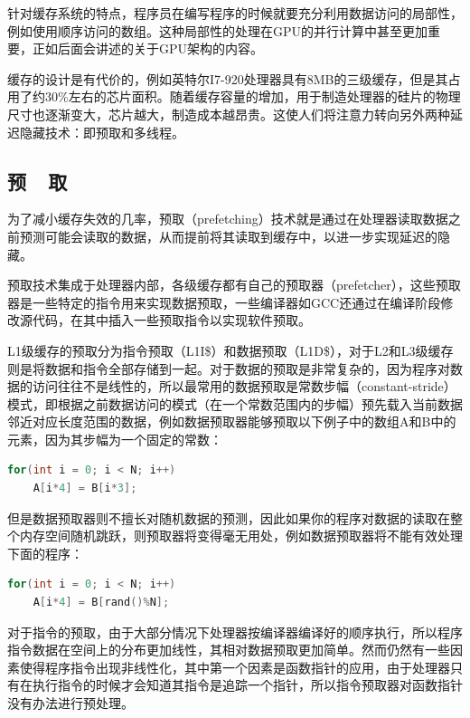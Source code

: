 针对缓存系统的特点，程序员在编写程序的时候就要充分利用数据访问的局部性，例如使用顺序访问的数组。这种局部性的处理在GPU的并行计算中甚至更加重要，正如后面会讲述的关于GPU架构的内容。

缓存的设计是有代价的，例如英特尔I7-920处理器具有8MB的三级缓存，但是其占用了约$30\%$左右的芯片面积。随着缓存容量的增加，用于制造处理器的硅片的物理尺寸也逐渐变大，芯片越大，制造成本越昂贵。这使人们将注意力转向另外两种延迟隐藏技术：即预取和多线程。




\subsection{预~~取}
为了减小缓存失效的几率，预取（prefetching）技术就是通过在处理器读取数据之前预测可能会读取的数据，从而提前将其读取到缓存中，以进一步实现延迟的隐藏。

预取技术集成于处理器内部，各级缓存都有自己的预取器（prefetcher），这些预取器是一些特定的指令用来实现数据预取，一些编译器如GCC还通过在编译阶段修改源代码，在其中插入一些预取指令以实现软件预取。

L1级缓存的预取分为指令预取（L1I\$）和数据预取（L1D\$），对于L2和L3级缓存则是将数据和指令全部存储到一起。对于数据的预取是非常复杂的，因为程序对数据的访问往往不是线性的，所以最常用的数据预取是常数步幅（constant-stride）模式，即根据之前数据访问的模式（在一个常数范围内的步幅）预先载入当前数据邻近对应长度范围的数据，例如数据预取器能够预取以下例子中的数组A和B中的元素，因为其步幅为一个固定的常数：

\begin{lstlisting}[language=C++,mathescape]
for(int i = 0; i < N; i++)
    A[i*4] = B[i*3];
\end{lstlisting}

但是数据预取器则不擅长对随机数据的预测，因此如果你的程序对数据的读取在整个内存空间随机跳跃，则预取器将变得毫无用处，例如数据预取器将不能有效处理下面的程序：

\begin{lstlisting}[language=C++,mathescape]
for(int i = 0; i < N; i++)
    A[i*4] = B[rand()%N];
\end{lstlisting}

对于指令的预取，由于大部分情况下处理器按编译器编译好的顺序执行，所以程序指令数据在空间上的分布更加线性，其相对数据预取更加简单。然而仍然有一些因素使得程序指令出现非线性化，其中第一个因素是函数指针的应用，由于处理器只有在执行指令的时候才会知道其指令是追踪一个指针，所以指令预取器对函数指针没有办法进行预处理。

